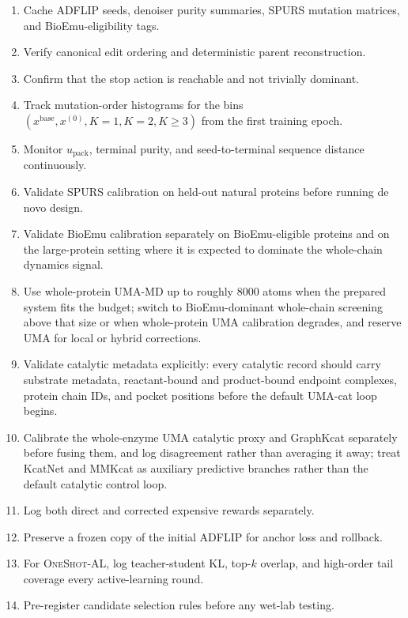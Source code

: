 \documentclass[11pt]{article}
\newcommand{\packunc}{\ensuremath{u_{\mathrm{pack}}}}
\newcommand{\methodIII}{\textsc{OneShot-AL}}
\begin{document}
	\begin{enumerate}[leftmargin=1.5em]
		\item Cache ADFLIP seeds, denoiser purity summaries, SPURS mutation matrices, and BioEmu-eligibility tags.
		\item Verify canonical edit ordering and deterministic parent reconstruction.
		\item Confirm that the stop action is reachable and not trivially dominant.
		\item Track mutation-order histograms for the bins $(x^{\mathrm{base}},x^{(0)},K=1,K=2,K\ge 3)$ from the first training epoch.
		\item Monitor \packunc{}, terminal purity, and seed-to-terminal sequence distance continuously.
		\item Validate SPURS calibration on held-out natural proteins before running de novo design.
		\item Validate BioEmu calibration separately on BioEmu-eligible proteins and on the large-protein setting where it is expected to dominate the whole-chain dynamics signal.
		\item Use whole-protein UMA-MD up to roughly $8000$ atoms when the prepared system fits the budget; switch to BioEmu-dominant whole-chain screening above that size or when whole-protein UMA calibration degrades, and reserve UMA for local or hybrid corrections.
		\item Validate catalytic metadata explicitly: every catalytic record should carry substrate metadata, reactant-bound and product-bound endpoint complexes, protein chain IDs, and pocket positions before the default UMA-cat loop begins.
		\item Calibrate the whole-enzyme UMA catalytic proxy and GraphKcat separately before fusing them, and log disagreement rather than averaging it away; treat KcatNet and MMKcat as auxiliary predictive branches rather than the default catalytic control loop.
		\item Log both direct and corrected expensive rewards separately.
		\item Preserve a frozen copy of the initial ADFLIP for anchor loss and rollback.
		\item For \methodIII{}, log teacher-student KL, top-$k$ overlap, and high-order tail coverage every active-learning round.
		\item Pre-register candidate selection rules before any wet-lab testing.
	\end{enumerate}
	
\end{document}
